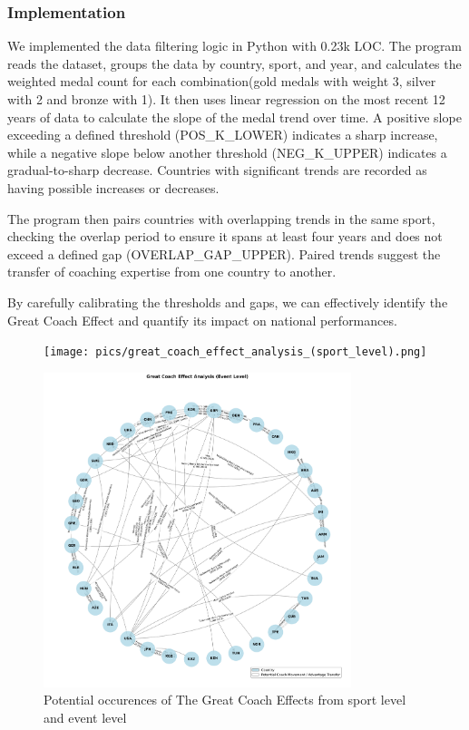 \documentclass{mcmthesis}
\begin{document}
\subsubsection{Implementation}

We implemented the data filtering logic in Python with 0.23k LOC. The program reads the dataset, groups the data by country, sport, and year, and calculates the weighted medal count for each combination(gold medals with weight 3, silver with 2 and bronze with 1). It then uses linear regression on the most recent 12 years of data to calculate the slope of the medal trend over time. A positive slope exceeding a defined threshold (POS\_K\_LOWER) indicates a sharp increase, while a negative slope below another threshold (NEG\_K\_UPPER) indicates a gradual-to-sharp decrease. Countries with significant trends are recorded as having possible increases or decreases.

The program then pairs countries with overlapping trends in the same sport, checking the overlap period to ensure it spans at least four years and does not exceed a defined gap (OVERLAP\_GAP\_UPPER). Paired trends suggest the transfer of coaching expertise from one country to another.

By carefully calibrating the thresholds and gaps, we can effectively identify the Great Coach Effect and quantify its impact on national performances.

\begin{figure}[htbp]
    \begin{minipage}[t]{0.5\textwidth}
        \centering
        \texttt{[image: pics/great\_coach\_effect\_analysis\_(sport\_level).png]}
    \end{minipage}
    \begin{minipage}[t]{0.5\textwidth}
        \centering
        \includegraphics[width=0.8\textwidth]{pics/great_coach_effect_analysis_(event_level).png}
    \end{minipage}
    \caption{Potential occurences of The Great Coach Effects from sport level and event level}
\end{figure}
\end{document}
